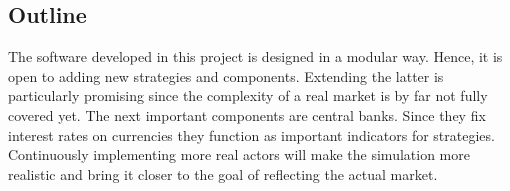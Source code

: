 \subsection{Outline}
The software developed in this project is designed in a modular way. Hence, it is open
to adding new strategies and components. Extending the latter is particularly
promising since the complexity of a real market is by far not fully covered yet. The next
important components are central banks. Since they fix interest rates on currencies
they function as important indicators for strategies. Continuously implementing more
real actors will make the simulation more realistic and bring it closer to the goal
of reflecting the actual market.


%
%
%
%
%
%
%
%
%
%
%
%
%

